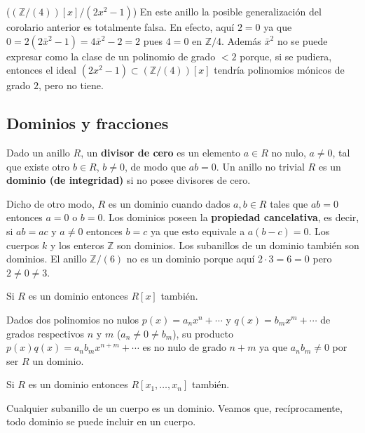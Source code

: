 \textrm{\normalfont ($(\mathbb Z/(4))[x]/(2x^2-1)$)} En
este anillo la posible generalización del corolario anterior es
totalmente falsa. En efecto, aquí \(2=0\) ya que
\(0=2(2\bar x^2-1)=4\bar x^2-2=2\) pues \(4=0\) en \(\mathbb Z/4\).
Además \(\bar x^2\) no se puede expresar como la clase de un polinomio
de grado \({<}2\) porque, si se pudiera, entonces el ideal
\((2x^2-1)\subset (\mathbb Z/(4))[x]\) tendría polinomios mónicos de
grado \(2\), pero no tiene. 

\hypertarget{dominios-y-fracciones}{%
\subsection{Dominios y fracciones}\label{dominios-y-fracciones}}


Dado un anillo \(R\), un \textbf{divisor de cero} es un elemento
\(a\in R\) no nulo, \(a\neq 0\), tal que existe otro \(b\in R\),
\(b\neq 0\), de modo que \(ab=0\). Un anillo no trivial \(R\) es un
\textbf{dominio (de integridad)} si no posee divisores de cero.


Dicho de otro modo, \(R\) es un dominio cuando dados \(a,b\in R\) tales
que \(ab=0\) entonces \(a=0\) o \(b=0\). Los dominios poseen la
\textbf{propiedad cancelativa}, es decir, si \(ab=ac\) y \(a\neq 0\)
entonces \(b=c\) ya que esto equivale a \(a(b-c)=0\). Los cuerpos \(k\)
y los enteros \(\mathbb Z\) son dominios. Los subanillos de un dominio
también son dominios. El anillo \(\mathbb Z/(6)\) no es un dominio
porque aquí \(2\cdot 3=6=0\) pero \(2\neq 0\neq 3\). 


Si \(R\) es un dominio entonces \(R[x]\) también. 


Dados dos polinomios no nulos \(p(x)=a_nx^n+\cdots\) y
\(q(x)=b_mx^m+\cdots\) de grados respectivos \(n\) y \(m\)
(\(a_n\neq 0\neq b_m\)), su producto \(p(x)q(x)=a_nb_mx^{n+m}+\cdots\)
es no nulo de grado \(n+m\) ya que \(a_nb_m\neq 0\) por ser \(R\) un
dominio. 


Si \(R\) es un dominio entonces \(R[x_1,\dots, x_n]\) también.

Cualquier subanillo de un cuerpo es un dominio. Veamos que,
recíprocamente, todo dominio se puede incluir en un cuerpo.

